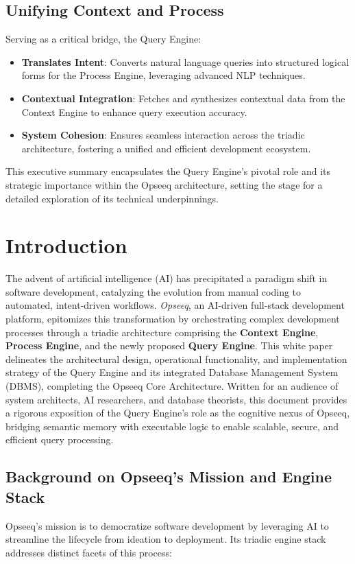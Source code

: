 \documentclass[11pt]{article}
\begin{document}
\subsection{Unifying Context and Process}
Serving as a critical bridge, the Query Engine:
\begin{itemize}
    \item \textbf{Translates Intent}: Converts natural language queries into structured logical forms for the Process Engine, leveraging advanced NLP techniques.
    \item \textbf{Contextual Integration}: Fetches and synthesizes contextual data from the Context Engine to enhance query execution accuracy.
    \item \textbf{System Cohesion}: Ensures seamless interaction across the triadic architecture, fostering a unified and efficient development ecosystem.
\end{itemize}

This executive summary encapsulates the Query Engine’s pivotal role and its strategic importance within the Opseeq architecture, setting the stage for a detailed exploration of its technical underpinnings.



\section{Introduction}
\label{sec:introduction}

The advent of artificial intelligence (AI) has precipitated a paradigm shift in software development, catalyzing the evolution from manual coding to automated, intent-driven workflows. \emph{Opseeq}, an AI-driven full-stack development platform, epitomizes this transformation by orchestrating complex development processes through a triadic architecture comprising the \textbf{Context Engine}, \textbf{Process Engine}, and the newly proposed \textbf{Query Engine}. This white paper delineates the architectural design, operational functionality, and implementation strategy of the Query Engine and its integrated Database Management System (DBMS), completing the Opseeq Core Architecture. Written for an audience of system architects, AI researchers, and database theorists, this document provides a rigorous exposition of the Query Engine’s role as the cognitive nexus of Opseeq, bridging semantic memory with executable logic to enable scalable, secure, and efficient query processing.

\subsection{Background on Opseeq’s Mission and Engine Stack}
Opseeq’s mission is to democratize software development by leveraging AI to streamline the lifecycle from ideation to deployment. Its triadic engine stack addresses distinct facets of this process:
\end{document}
